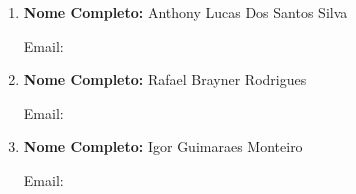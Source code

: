 \documentclass[a4paper,12pt]{article} %
\begin{document}
\begin{enumerate}
    \item \textbf{Nome Completo:} Anthony Lucas Dos Santos Silva
    \begin{description}
        \item [Email:] 
    \end{description}

    \item \textbf{Nome Completo:} Rafael Brayner Rodrigues
    \begin{description}
        \item [Email:] 
    \end{description}

    \item \textbf{Nome Completo:} Igor Guimaraes Monteiro
    \begin{description}
        \item [Email:] 
    \end{description}


\end{enumerate}
\end{document}
